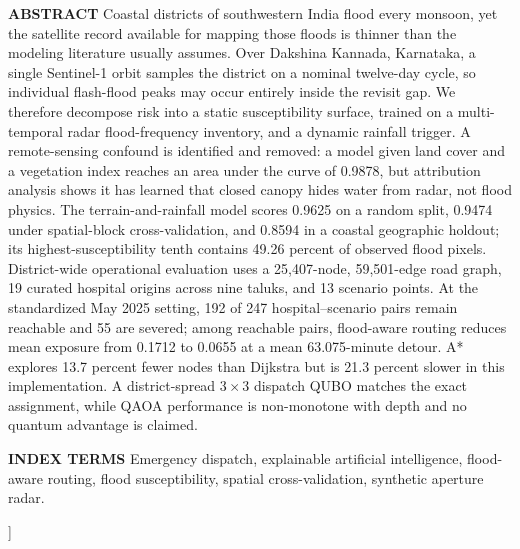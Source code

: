 \documentclass[10pt,twocolumn]{article}
\begin{document}
\begin{@twocolumnfalse}
\begin{minipage}{\dimexpr\textwidth-0.958in\relax}
{\fontsize{10}{12}\selectfont
{\helv\bfseries\color{accessblue}ABSTRACT }Coastal districts of southwestern India flood every monsoon, yet the satellite record available for mapping those floods is thinner than the modeling literature usually assumes. Over Dakshina Kannada, Karnataka, a single Sentinel-1 orbit samples the district on a nominal twelve-day cycle, so individual flash-flood peaks may occur entirely inside the revisit gap. We therefore decompose risk into a static susceptibility surface, trained on a multi-temporal radar flood-frequency inventory, and a dynamic rainfall trigger. A remote-sensing confound is identified and removed: a model given land cover and a vegetation index reaches an area under the curve of 0.9878, but attribution analysis shows it has learned that closed canopy hides water from radar, not flood physics. The terrain-and-rainfall model scores 0.9625 on a random split, 0.9474 under spatial-block cross-validation, and 0.8594 in a coastal geographic holdout; its highest-susceptibility tenth contains 49.26 percent of observed flood pixels. District-wide operational evaluation uses a 25,407-node, 59,501-edge road graph, 19 curated hospital origins across nine taluks, and 13 scenario points. At the standardized May 2025 setting, 192 of 247 hospital--scenario pairs remain reachable and 55 are severed; among reachable pairs, flood-aware routing reduces mean exposure from 0.1712 to 0.0655 at a mean 63.075-minute detour. A* explores 13.7 percent fewer nodes than Dijkstra but is 21.3 percent slower in this implementation. A district-spread $3\times3$ dispatch QUBO matches the exact assignment, while QAOA performance is non-monotone with depth and no quantum advantage is claimed.\par}

\vspace{9pt}

{\fontsize{10}{12}\selectfont\raggedright
{\helv\bfseries\color{accessblue}INDEX TERMS }Emergency dispatch, explainable artificial intelligence, flood-aware routing, flood susceptibility, spatial cross-validation, synthetic aperture radar.\par}
\end{minipage}

\vspace{16pt}
\end{@twocolumnfalse}
]
\end{document}
